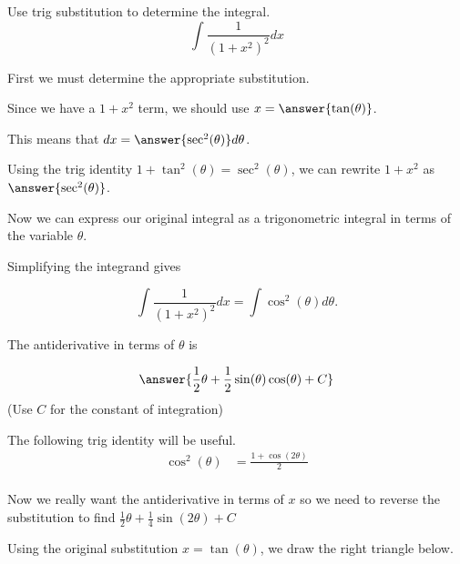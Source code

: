 \documentclass{ximera}
\author{Jason Miller}
\begin{document}
\begin{exercise}
Use trig substitution to determine the integral.
\[
\int \frac{1}{(1+x^2)^2} dx
\]

First we must determine the appropriate substitution. 

Since we have a $1+x^2$ term, we should use $x=\answer{\tan(\theta)}$. 

This means that $dx= \answer{ \sec^{2}(\theta)} d\theta$. 

\begin{exercise}
Using the trig identity $1+\tan^2(\theta)=\sec^{2}(\theta)$, we can rewrite $1+x^2$ as $\answer{\sec^{2}(\theta)}$. 

Now we can express our original integral as a trigonometric integral in terms of the variable $\theta$. 

\begin{image}
  \end{image}

Simplifying the integrand gives

\[
\int \frac{1}{(1+x^2)^2} dx  = \int \cos^2(\theta) d\theta.
\]

The antiderivative in terms of $\theta$ is 

\[
\answer{ \frac{1}{2}\theta + \frac{1}{2}\sin(\theta)\cos(\theta) + C}
\]
(Use $C$ for the constant of integration)

\begin{hint}
The following trig identity will be useful.
\begin{align}
\cos^{2}(\theta)&=\frac{1+\cos(2\theta)}{2} \\
\end{align}
\end{hint}

Now we really want the antiderivative in terms of $x$ so we need to reverse the substitution to find $\frac{1}{2}\theta + \frac{1}{4} \sin(2 \theta) + C$

\begin{exercise}
Using the original substitution $x=\tan(\theta)$, we draw the right triangle below.


\end{exercise}
\end{exercise}
\end{exercise}
\end{document}

